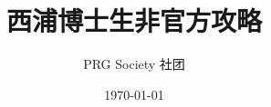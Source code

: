 \documentclass[lang=cn,12pt,newtx]{elegantbook}
\title{西浦博士生非官方攻略}
\author{PRG Society 社团}
\date{\today}
\begin{document}
\maketitle
\frontmatter



\tableofcontents
\mainmatter








\backmatter	
\makeatletter
\makeatother
\end{document}
